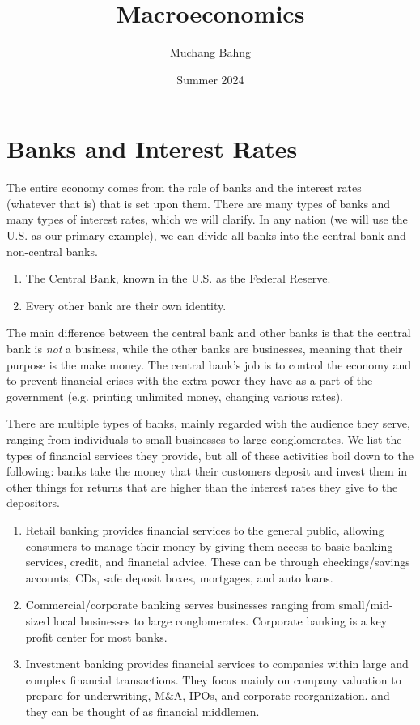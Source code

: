 \documentclass{article}
\begin{document}
\title{Macroeconomics}
\author{Muchang Bahng}
\date{Summer 2024}

\maketitle
\tableofcontents
\pagebreak

\section{Banks and Interest Rates}

  The entire economy comes from the role of banks and the interest rates (whatever that is) that is set upon them. There are many types of banks and many types of interest rates, which we will clarify. In any nation (we will use the U.S. as our primary example), we can divide all banks into the central bank and non-central banks. 
  \begin{enumerate}
    \item The Central Bank, known in the U.S. as the Federal Reserve. 
    \item Every other bank are their own identity. 
  \end{enumerate}
  The main difference between the central bank and other banks is that the central bank is \textit{not} a business, while the other banks are businesses, meaning that their purpose is the make money. The central bank's job is to control the economy and to prevent financial crises with the extra power they have as a part of the government (e.g. printing unlimited money, changing various rates). 

  There are multiple types of banks, mainly regarded with the audience they serve, ranging from individuals to small businesses to large conglomerates. We list the types of financial services they provide, but all of these activities boil down to the following: banks take the money that their customers deposit and invest them in other things for returns that are higher than the interest rates they give to the depositors. 
  \begin{enumerate}
    \item Retail banking provides financial services to the general public, allowing consumers to manage their money by giving them access to basic banking services, credit, and financial advice. These can be through checkings/savings accounts, CDs, safe deposit boxes, mortgages, and auto loans. 
    \item Commercial/corporate banking serves businesses ranging from small/mid-sized local businesses to large conglomerates. Corporate banking is a key profit center for most banks. 
    \item Investment banking provides financial services to companies within large and complex financial transactions. They focus mainly on company valuation to prepare for underwriting, M\&A, IPOs, and corporate reorganization. and they can be thought of as financial middlemen. 
  \end{enumerate}
\end{document}
